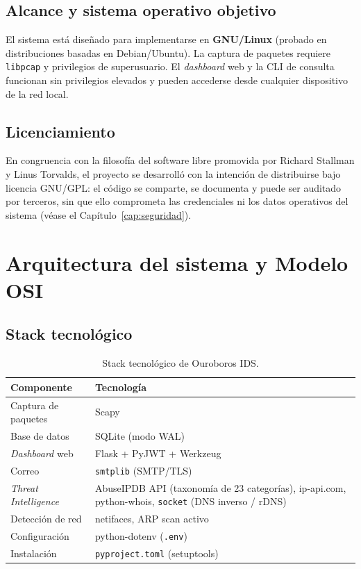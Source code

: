 \documentclass[12pt,letterpaper]{report}
\begin{document}
\section{Alcance y sistema operativo objetivo}
El sistema está diseñado para implementarse en \textbf{GNU/Linux} (probado en
distribuciones basadas en Debian/Ubuntu). La captura de paquetes requiere
\texttt{libpcap} y privilegios de superusuario. El \textit{dashboard} web y
la CLI de consulta funcionan sin privilegios elevados y pueden accederse
desde cualquier dispositivo de la red local.

\section{Licenciamiento}
En congruencia con la filosofía del software libre promovida por Richard
Stallman y Linus Torvalds, el proyecto se desarrolló con la intención de
distribuirse bajo licencia GNU/GPL: el código se comparte, se documenta y
puede ser auditado por terceros, sin que ello comprometa las credenciales ni
los datos operativos del sistema (véase el Capítulo~\ref{cap:seguridad}).

\chapter{Arquitectura del sistema y Modelo OSI}

\section{Stack tecnológico}

\begin{table}[H]
\centering
\caption{Stack tecnológico de Ouroboros IDS.}
\label{tab:stack}
\begin{tabular}{ll}
\toprule
\textbf{Componente} & \textbf{Tecnología} \\
\midrule
Captura de paquetes        & Scapy \\
Base de datos              & SQLite (modo WAL) \\
\textit{Dashboard} web     & Flask + PyJWT + Werkzeug \\
Correo                     & \texttt{smtplib} (SMTP/TLS) \\
\textit{Threat Intelligence} & AbuseIPDB API (taxonomía de 23 categorías), ip-api.com,
                               python-whois, \texttt{socket} (DNS inverso / rDNS) \\
Detección de red           & netifaces, ARP scan activo \\
Configuración              & python-dotenv (\texttt{.env}) \\
Instalación                & \texttt{pyproject.toml} (setuptools) \\
\bottomrule
\end{tabular}
\end{table}
\end{document}

